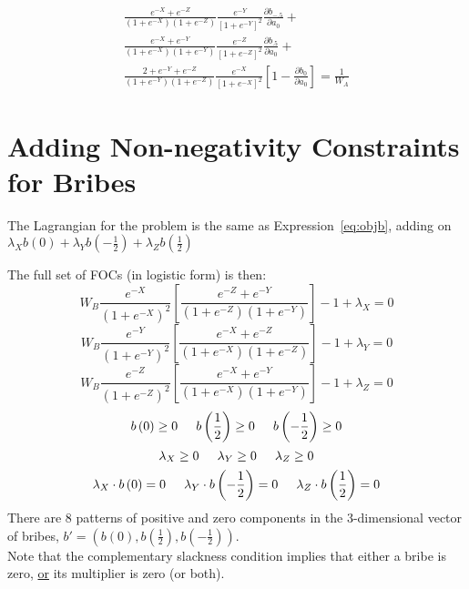\documentclass[12pt]{article}
\newcommand{\un}{\underline}
\begin{document}
\begin{enumerate}
\begin{itemize}
			 \begin{multline}
					 \frac{e^{-X} + e^{-Z}}{\left(1+e^{-X}\right)\left(1+e^{-Z}\right)} \frac{e^{-Y}}{\left[1+e^{-Y}\right]^2} \frac{\partial b_{-.5}}{\partial a_0} + \\ 
					\frac{e^{-X} + e^{-Y}}{\left(1+e^{-X}\right)\left(1+e^{-Y}\right)} \frac{e^{-Z}}{\left[1+e^{-Z}\right]^2}\frac{\partial b_{.5}}{\partial a_0} + \\
					\frac{2+e^{-Y} + e^{-Z}}{\left(1+e^{-Y}\right)\left(1+e^{-Z}\right)} \frac{e^{-X}}{\left[1+e^{-X}\right]^2}\left[1 - \frac{\partial b_0}{\partial a_0} \right] = \frac{1}{W_A}
					\label{eq:focA}
				\end{multline}
		\end{itemize}
\end{enumerate}

	

\newpage
\section{Adding Non-negativity Constraints for Bribes}
\label{sec:nonneg}
The Lagrangian for the problem is the same as Expression~\ref{eq:objb}, adding on $\lambda_X b\left(0\right) + \lambda_Y b\left(-\frac{1}{2}\right) + \lambda_Z b\left(\frac{1}{2}\right)$

The full set of FOCs (in logistic form) is then:
\[
    W_B\frac{e^{-X}}{\left(1+e^{-X}\right)^2}\left[\frac{e^{-Z} + e^{-Y}}{\left(1+e^{-Z}\right)\left(1+e^{-Y}\right)} \right] - 1 + \lambda_X = 0
\]
\[
    W_B\frac{e^{-Y}}{\left(1+e^{-Y}\right)^2}\left[\frac{e^{-X} + e^{-Z}}{\left(1+e^{-X}\right)\left(1+e^{-Z}\right)} \right] - 1 + \lambda_Y = 0 
\]
\[
    W_B\frac{e^{-Z}}{\left(1+e^{-Z}\right)^2}\left[\frac{e^{-X} + e^{-Y}}{\left(1+e^{-X}\right)\left(1+e^{-Y}\right)} \right] - 1 + \lambda_Z = 0
\]
\[
  b\left(0\right) \geq0 \hskip.2in b\left(\frac{1}{2}\right) \geq0 \hskip.2in b\left(-\frac{1}{2}\right) \geq0 
\]
\[
  \lambda_X \geq0 \hskip.2in \lambda_Y \geq0 \hskip.2in \lambda_Z \geq0 
\]
\[
  \lambda_X \cdot b\left(0\right) = 0 \hskip.2in \lambda_Y \cdot b\left(-\frac{1}{2}\right) = 0 \hskip.2in \lambda_Z \cdot b\left(\frac{1}{2}\right) = 0 
\]
There are 8 patterns of positive and zero components in the 3-dimensional vector of bribes, $b' = \left(b\left(0\right),b\left(\frac{1}{2}\right), b\left(-\frac{1}{2}\right)\right)$. \\

Note that the complementary slackness condition implies that either a bribe is zero, \un{or} its multiplier is zero (or both).
\end{document}

